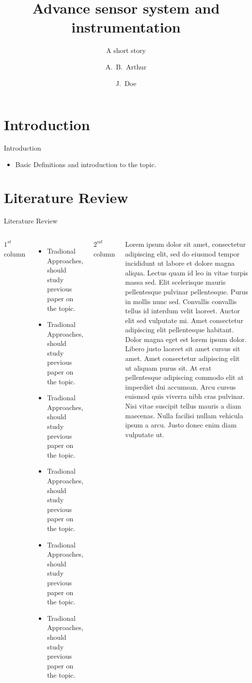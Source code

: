 \documentclass[dvipsnames,mathserif,aspectratio=169,10pt]{beamer}
\title[About] %
{Advance sensor system and instrumentation}
\subtitle{A short story}
\author[Arthur, Doe] %
{A.~B.~Arthur\inst{1} \and J.~Doe\inst{2}}
\institute[VFU] %
{
  \inst{1}%
  Faculty of Physics\\
  Very Famous University
  \and
  \inst{2}%
  Faculty of Chemistry\\
  Very Famous University
}
\begin{document}
\begin{frame}
\maketitle
\transfade[duration=0.2]
\end{frame}


%
 \footnotesize \tableofcontents   
%
\section{Introduction} 
\begin{frame}{Introduction}
    \begin{itemize}
        \item Basic Definitions and introduction to the topic.
    \end{itemize}
    \transfade[duration=0.2]
\end{frame}


\section{Literature Review}
\begin{frame}{Literature Review}
\begin{columns}
$1^{st}$ column
      \begin{itemize}
        \item Tradional Approaches, should study previous paper on the topic.
        \item Tradional Approaches, should study previous paper on the topic.
        \item Tradional Approaches, should study previous paper on the topic.
        \item Tradional Approaches, should study previous paper on the topic.
        \item Tradional Approaches, should study previous paper on the topic.
        \item Tradional Approaches, should study previous paper on the topic.
        
        
    \end{itemize}
    \justifying
    $2^{nd}$ column
    
      Lorem ipsum dolor sit amet, consectetur adipiscing elit, sed do eiusmod tempor incididunt ut labore et dolore magna aliqua. Lectus quam id leo in vitae turpis massa sed. Elit scelerisque mauris pellentesque pulvinar pellentesque. Purus in mollis nunc sed. Convallis convallis tellus id interdum velit laoreet. Auctor elit sed vulputate mi. Amet consectetur adipiscing elit pellentesque habitant. Dolor magna eget est lorem ipsum dolor. Libero justo laoreet sit amet cursus sit amet. Amet consectetur adipiscing elit ut aliquam purus sit. At erat pellentesque adipiscing commodo elit at imperdiet dui accumsan. Arcu cursus euismod quis viverra nibh cras pulvinar. Nisi vitae suscipit tellus mauris a diam maecenas. Nulla facilisi nullam vehicula ipsum a arcu. Justo donec enim diam vulputate ut.

\end{columns}
    \transfade[duration=0.2]  
\end{frame}
\end{document}

